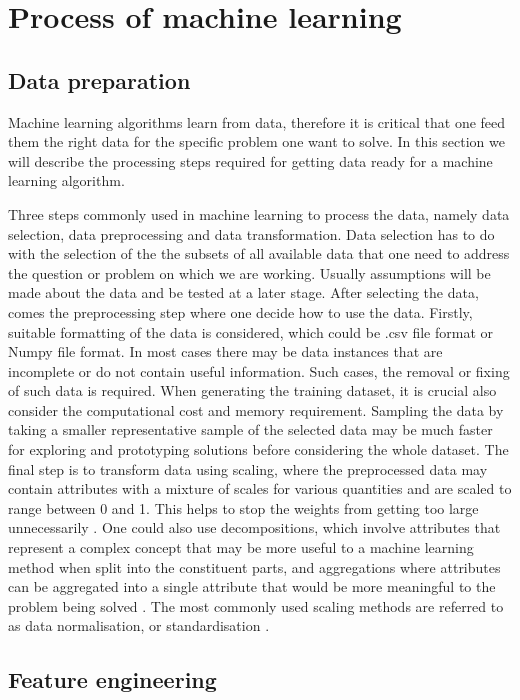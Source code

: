 \section{Process of machine learning}
\label{Process}
\subsection{Data preparation}
Machine learning algorithms learn from data, therefore it is critical that one feed them the right data for the specific problem one want to solve. In this section we will describe the processing steps required for getting data ready for a machine learning algorithm.

Three steps commonly used in machine learning to process the data, namely data selection, data preprocessing  and data transformation. Data selection has to do with the selection of the the subsets of all available data that one need to address the question or problem on which we are working. Usually assumptions will be made  about the data and be tested at a later stage. After selecting the data, comes the preprocessing step where one decide how to use the data. Firstly, suitable formatting of the data is considered, which could be .csv file format or Numpy file format. In most cases there may be data instances that are incomplete or do not contain useful information. Such cases, the removal or fixing of such data is required. When generating the training dataset, it is crucial  also consider the computational cost and memory requirement. Sampling the data by taking a smaller representative sample of the selected data may be much faster for exploring and prototyping solutions before considering the whole dataset. The final step is to transform data using scaling, where the preprocessed data may contain attributes with a mixture of scales for various quantities and are scaled to range between 0 and 1. This helps to stop the weights from getting too large unnecessarily \citep{marsland2015machine}. One could also use decompositions, which involve attributes that represent a complex concept that may be more useful to a machine learning method when split into the constituent parts, and  aggregations where attributes can be aggregated into a single attribute that would be more meaningful to the problem being solved \citep{brownlee2013prepare}. The most commonly used scaling methods are referred to as data normalisation, or standardisation \citep{marsland2015machine}.
    
\subsection{Feature engineering}

